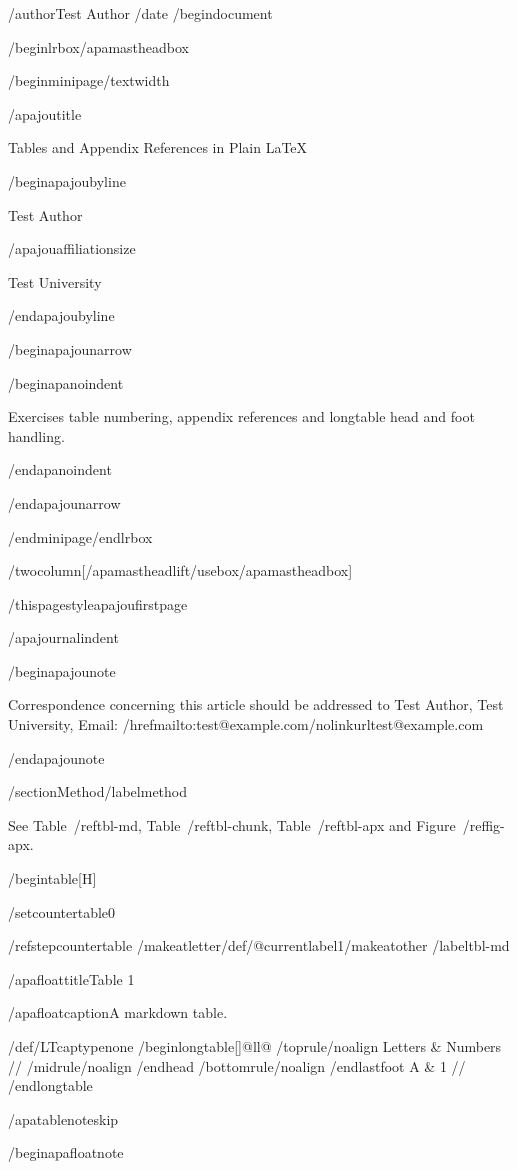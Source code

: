 /author{Test Author}
/date{}
/begin{document}


/begin{lrbox}{/apamastheadbox}%

/begin{minipage}{/textwidth}

/apajoutitle{

Tables and Appendix References in Plain LaTeX

}

/begin{apajoubyline}

Test Author

/apajouaffiliationsize

Test University

/end{apajoubyline}

/begin{apajounarrow}

/begin{apanoindent}

Exercises table numbering, appendix references and longtable head and
foot handling.

/end{apanoindent}

/end{apajounarrow}

/end{minipage}/end{lrbox}

/twocolumn[/apamastheadlift/usebox{/apamastheadbox}]

/thispagestyle{apajoufirstpage}

/apajournalindent

/begin{apajounote}

Correspondence concerning this article should be addressed to Test
Author, Test University, Email:
/href{mailto:test@example.com}{/nolinkurl{test@example.com}}

/end{apajounote}

/section{Method}/label{method}

See Table~/ref{tbl-md}, Table~/ref{tbl-chunk}, Table~/ref{tbl-apx} and
Figure~/ref{fig-apx}.

/begin{table}[H]

/setcounter{table}{0}

/refstepcounter{table}%
/makeatletter/def/@currentlabel{1}/makeatother%
/label{tbl-md}

/apafloattitle{Table 1}

/apafloatcaption{A markdown table.}

{/def/LTcaptype{none} %
/begin{longtable}[]{@{}ll@{}}
/toprule/noalign{}
Letters & Numbers //
/midrule/noalign{}
/endhead
/bottomrule/noalign{}
/endlastfoot
A & 1 //
/end{longtable}
}

/apatablenoteskip

/begin{apafloatnote}

